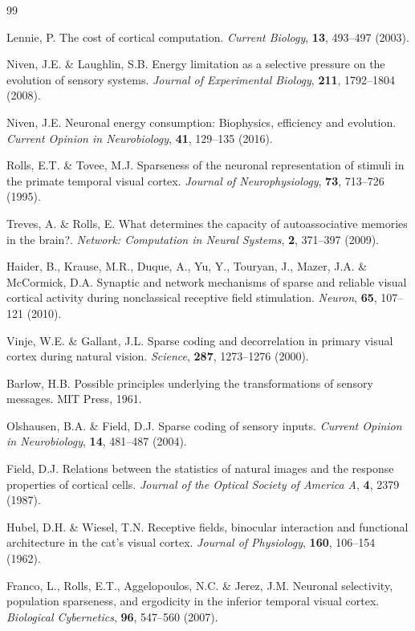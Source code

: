 \begin{thebibliography}{99}

 Lennie, P. The cost of cortical computation. \emph{Current Biology}, \textbf{13}, 493--497 (2003).

 Niven, J.E. \& Laughlin, S.B. Energy limitation as a selective pressure on the evolution of sensory systems. \emph{Journal of Experimental Biology}, \textbf{211}, 1792--1804 (2008).

 Niven, J.E. Neuronal energy consumption: Biophysics, efficiency and evolution. \emph{Current Opinion in Neurobiology}, \textbf{41}, 129--135 (2016).

 Rolls, E.T. \& Tovee, M.J. Sparseness of the neuronal representation of stimuli in the primate temporal visual cortex. \emph{Journal of Neurophysiology}, \textbf{73}, 713--726 (1995).

 Treves, A. \& Rolls, E. What determines the capacity of autoassociative memories in the brain?. \emph{Network: Computation in Neural Systems}, \textbf{2}, 371--397 (2009).

 Haider, B., Krause, M.R., Duque, A., Yu, Y., Touryan, J., Mazer, J.A. \& McCormick, D.A. Synaptic and network mechanisms of sparse and reliable visual cortical activity during nonclassical receptive field stimulation. \emph{Neuron}, \textbf{65}, 107--121 (2010).

 Vinje, W.E. \& Gallant, J.L. Sparse coding and decorrelation in primary visual cortex during natural vision. \emph{Science}, \textbf{287}, 1273--1276 (2000).

 Barlow, H.B. Possible principles underlying the transformations of sensory messages. MIT Press, 1961.

 Olshausen, B.A. \& Field, D.J. Sparse coding of sensory inputs. \emph{Current Opinion in Neurobiology}, \textbf{14}, 481--487 (2004).

 Field, D.J. Relations between the statistics of natural images and the response properties of cortical cells. \emph{Journal of the Optical Society of America A}, \textbf{4}, 2379 (1987).

 Hubel, D.H. \& Wiesel, T.N. Receptive fields, binocular interaction and functional architecture in the cat's visual cortex. \emph{Journal of Physiology}, \textbf{160}, 106--154 (1962).

 Franco, L., Rolls, E.T., Aggelopoulos, N.C. \& Jerez, J.M. Neuronal selectivity, population sparseness, and ergodicity in the inferior temporal visual cortex. \emph{Biological Cybernetics}, \textbf{96}, 547--560 (2007).


\end{thebibliography}
